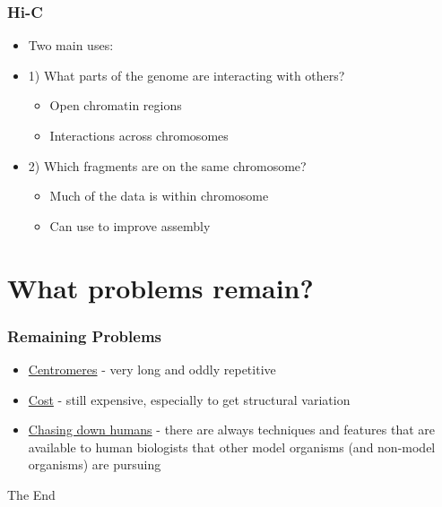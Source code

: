 \documentclass[14pt,handout]{beamer}
\begin{document}
\begin{frame}
\frametitle{Hi-C}
\begin{itemize}
	\item<+-> Two main uses:
	\item<+-> 1) What parts of the genome are interacting with others?
	\begin{itemize}
		\item<+-> Open chromatin regions
		\item<+-> Interactions across chromosomes
	\end{itemize}
	\item<+-> 2) Which fragments are on the same chromosome?
	\begin{itemize}
		\item<+-> Much of the data is within chromosome
		\item<+-> Can use to improve assembly
	\end{itemize}
\end{itemize}
\end{frame}


%

\section{What problems remain?}

\begin{frame}
\frametitle{Remaining Problems}
\begin{itemize}
	\item<+-> \underline{Centromeres} - very long and oddly repetitive
	\item<+-> \underline{Cost} - still expensive, especially to get structural variation
	\item<+-> \underline{Chasing down humans} - there are always techniques and features that are available to human biologists that other model organisms (and non-model organisms) are pursuing
\end{itemize}
\end{frame}



\begin{frame}
\Huge{\centerline{The End}}
\end{frame}

\end{document}
